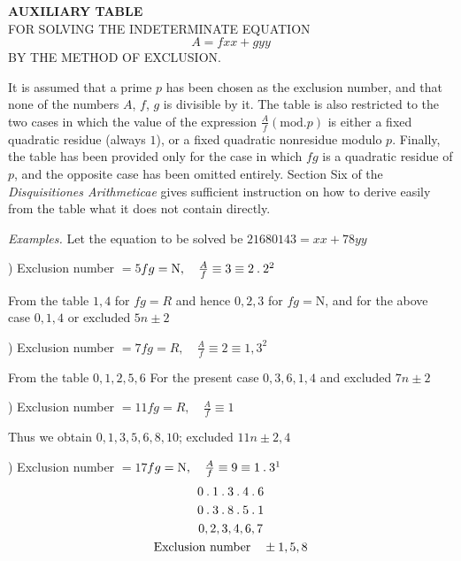 \clearpage{}
\renewcommand{\BookRunningTitle}{Auxiliary Table for Solving the Indeterminate Equation}
\begin{center}
\textbf{AUXILIARY TABLE}\\[.7em]
FOR SOLVING THE INDETERMINATE EQUATION
\[
A=fxx+gyy
\]
BY THE METHOD OF EXCLUSION.
\end{center}
It is assumed that a prime $p$ has been chosen as the exclusion number, and that none of the numbers $A$, $f$, $g$ is divisible by it. The table is also restricted to the two cases in which the value of the expression $\frac{A}{f}(\mathrm{mod}.p)$ is either a fixed quadratic residue (always $1$), or a fixed quadratic nonresidue modulo $p$. Finally, the table has been provided only for the case in which $fg$ is a quadratic residue of $p$, and the opposite case has been omitted entirely. Section Six of the \textit{Disquisitiones Arithmeticae} gives sufficient instruction on how to derive easily from the table what it does not contain directly.
\par\medskip\textit{Examples.} Let the equation to be solved be $21680143=xx+78yy$
\par\medskip{}) Exclusion number $=5$\hfill $fg=\mathrm{N},\quad \frac{A}{f}\equiv3\equiv2\mathbin{.}2^2$
\par\noindent From the table $1,4$ for $fg=R$ and hence $0,2,3$ for $fg=\mathrm{N}$,
and for the above case $0,1,4$ or excluded $5n\pm2$
\par\medskip{}) Exclusion number $=7$\hfill $fg=R,\quad \frac{A}{f}\equiv2\equiv1,3^2$
\par\noindent From the table $0,1,2,5,6$ For the present case $0,3,6,1,4$ and excluded $7n\pm2$
\par\medskip{}) Exclusion number $=11$\hfill $fg=R,\quad \frac{A}{f}\equiv1$
\par\noindent Thus we obtain $0,1,3,5,6,8,10$; excluded $11n\pm2,4$
\par\medskip{}) Exclusion number $=17$\hfill $fg=\mathrm{N},\quad \frac{A}{f}\equiv9\equiv1\mathbin{.}3^1$
\[
\begin{gathered}
0\mathbin{.}1\mathbin{.}3\mathbin{.}4\mathbin{.}6\\
0\mathbin{.}3\mathbin{.}8\mathbin{.}5\mathbin{.}1\\
0,2,3,4,6,7\\
\text{Exclusion number}\quad\pm1,5,8
\end{gathered}
\]
